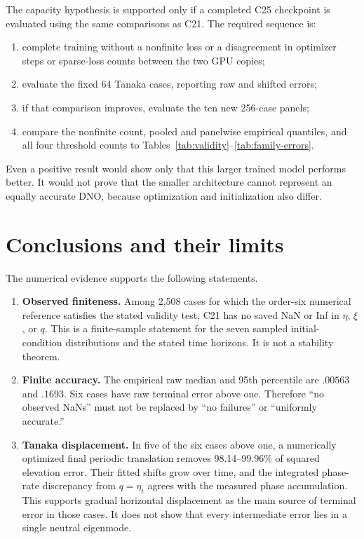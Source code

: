 \documentclass[11pt]{article}
\begin{document}
{The capacity hypothesis is supported only if a completed C25 checkpoint is
evaluated using the same comparisons as C21.  The required sequence is:
\begin{enumerate}[leftmargin=*]
  \item complete training without a nonfinite loss or a disagreement in
  optimizer steps or sparse-loss counts between the two GPU copies;
  \item evaluate the fixed 64 Tanaka cases, reporting raw and shifted errors;
  \item if that comparison improves, evaluate the ten new 256-case panels;
  \item compare the nonfinite count, pooled and panelwise empirical quantiles,
  and all four threshold counts to Tables~\ref{tab:validity}--\ref{tab:family-errors}.
\end{enumerate}
Even a positive result would show only that this larger trained model performs
better.  It would not prove that the smaller architecture cannot represent an
equally accurate DNO, because optimization and initialization also differ.

\section{Conclusions and their limits}

The numerical evidence supports the following statements.

\begin{enumerate}[leftmargin=*,label=\textbf{\arabic*.}]
  \item \textbf{Observed finiteness.}  Among 2,508 cases for which the
  order-six numerical reference satisfies the stated validity test, C21 has no
  saved NaN or Inf in $\eta$, $\xi$, or $q$.  This is a finite-sample statement
  for the seven sampled initial-condition distributions and the stated time
  horizons.  It is not a stability theorem.

  \item \textbf{Finite accuracy.}  The empirical raw median and 95th
  percentile are $.00563$ and $.1693$.  Six cases have raw terminal error above
  one.  Therefore ``no observed NaNs'' must not be replaced by ``no failures''
  or ``uniformly accurate.''

  \item \textbf{Tanaka displacement.}  In five of the six cases above one, a
  numerically optimized final periodic translation removes 98.14--99.96\% of
  squared elevation error.  Their fitted shifts grow over time, and the
  integrated phase-rate discrepancy from $q=\eta_t$ agrees with the measured
  phase accumulation.  This supports gradual horizontal displacement as the
  main source of terminal error in those cases.  It does not show that every
  intermediate error lies in a single neutral eigenmode.


\end{enumerate}}
\end{document}
